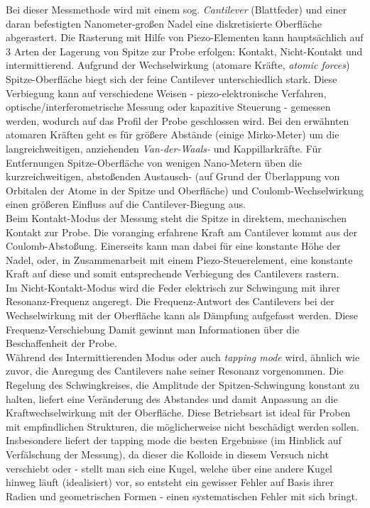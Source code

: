 \documentclass[numbers=noenddot,a4paper,notitlepage,twoside,BCOR15mm]{scrartcl}
\newcommand{\tilt}[1]{\textit{#1}}
\begin{document}
			Bei dieser Messmethode wird mit einem sog. \tilt{Cantilever} (Blattfeder) und einer daran befestigten Nanometer-großen Nadel eine diskretisierte Oberfläche abgerastert. Die Rasterung mit Hilfe von Piezo-Elementen kann hauptsächlich auf 3 Arten der Lagerung von Spitze zur Probe erfolgen: Kontakt, Nicht-Kontakt und intermittierend. Aufgrund der Wechselwirkung (atomare Kräfte, \tilt{atomic forces}) Spitze-Oberfläche biegt sich der feine Cantilever unterschiedlich stark. Diese Verbiegung kann auf verschiedene Weisen - piezo-elektronische Verfahren, optische/interferometrische Messung oder kapazitive Steuerung - gemessen werden, wodurch auf das Profil der Probe geschlossen wird. Bei den erwähnten atomaren Kräften geht es für größere Abstände (einige Mirko-Meter) um die langreichweitigen, anziehenden \tilt{Van-der-Waals-} und Kappillarkräfte. Für Entfernungen Spitze-Oberfläche von wenigen Nano-Metern üben die kurzreichweitigen, abstoßenden Austausch- (auf Grund der Überlappung von Orbitalen der Atome in der Spitze und Oberfläche) und Coulomb-Wechselwirkung einen größeren Einfluss auf die Cantilever-Biegung aus.\\
			Beim Kontakt-Modus der Messung steht die Spitze in direktem, mechanischen Kontakt zur Probe. Die voranging erfahrene Kraft am Cantilever kommt aus der Coulomb-Abstoßung. Einerseits kann man dabei für eine konstante Höhe der Nadel, oder, in Zusammenarbeit mit einem Piezo-Steuerelement, eine konstante Kraft auf diese und somit entsprechende Verbiegung des Cantilevers rastern.\\
			Im Nicht-Kontakt-Modus wird die Feder elektrisch zur Schwingung mit ihrer Resonanz-Frequenz angeregt. Die Frequenz-Antwort des Cantilevers bei der Wechselwirkung mit der Oberfläche kann als Dämpfung aufgefasst werden. Diese Frequenz-Verschiebung Damit gewinnt man Informationen über die Beschaffenheit der Probe.\\
			Während des Intermittierenden Modus oder auch \tilt{tapping mode} wird, ähnlich wie zuvor, die Anregung des Cantilevers nahe seiner Resonanz vorgenommen. Die Regelung des Schwingkreises, die Amplitude der Spitzen-Schwingung konstant zu halten, liefert eine Veränderung des Abstandes und damit Anpassung an die Kraftwechselwirkung mit der Oberfläche. Diese Betriebsart ist ideal für Proben mit empfindlichen Strukturen, die möglicherweise nicht beschädigt werden sollen. Insbesondere liefert der tapping mode die besten Ergebnisse (im Hinblick auf Verfälschung der Messung), da dieser die Kolloide in diesem Versuch nicht verschiebt oder - stellt man sich eine Kugel, welche über eine andere Kugel hinweg läuft (idealisiert) vor, so entsteht ein gewisser Fehler auf Basis ihrer Radien und geometrischen Formen - einen systematischen Fehler mit sich bringt.
\end{document}
